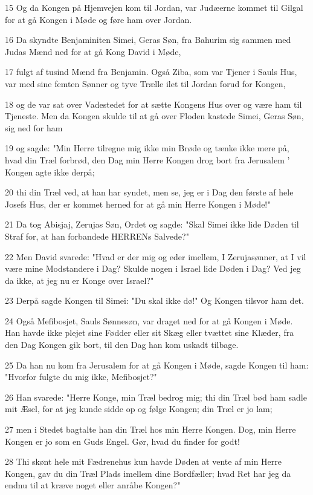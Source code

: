 \par 15 Og da Kongen på Hjemvejen kom til Jordan, var Judæerne kommet til Gilgal for at gå Kongen i Møde og føre ham over Jordan.
\par 16 Da skyndte Benjaminiten Simei, Geras Søn, fra Bahurim sig sammen med Judas Mænd ned for at gå Kong David i Møde,
\par 17 fulgt af tusind Mænd fra Benjamin. Også Ziba, som var Tjener i Sauls Hus, var med sine femten Sønner og tyve Trælle ilet til Jordan forud for Kongen,
\par 18 og de var sat over Vadestedet for at sætte Kongens Hus over og være ham til Tjeneste. Men da Kongen skulde til at gå over Floden kastede Simei, Geras Søn, sig ned for ham
\par 19 og sagde: "Min Herre tilregne mig ikke min Brøde og tænke ikke mere på, hvad din Træl forbrød, den Dag min Herre Kongen drog bort fra Jerusalem ' Kongen agte ikke derpå;
\par 20 thi din Træl ved, at han har syndet, men se, jeg er i Dag den første af hele Josefs Hus, der er kommet herned for at gå min Herre Kongen i Møde!"
\par 21 Da tog Abisjaj, Zerujas Søn, Ordet og sagde: "Skal Simei ikke lide Døden til Straf for, at han forbandede HERRENs Salvede?"
\par 22 Men David svarede: "Hvad er der mig og eder imellem, I Zerujasønner, at I vil være mine Modstandere i Dag? Skulde nogen i Israel lide Døden i Dag? Ved jeg da ikke, at jeg nu er Konge over Israel?"
\par 23 Derpå sagde Kongen til Simei: "Du skal ikke dø!" Og Kongen tilsvor ham det.
\par 24 Også Mefibosjet, Sauls Sønnesøn, var draget ned for at gå Kongen i Møde. Han havde ikke plejet sine Fødder eller sit Skæg eller tvættet sine Klæder, fra den Dag Kongen gik bort, til den Dag han kom uskadt tilbage.
\par 25 Da han nu kom fra Jerusalem for at gå Kongen i Møde, sagde Kongen til ham: "Hvorfor fulgte du mig ikke, Mefibosjet?"
\par 26 Han svarede: "Herre Konge, min Træl bedrog mig; thi din Træl bød ham sadle mit Æsel, for at jeg kunde sidde op og følge Kongen; din Træl er jo lam;
\par 27 men i Stedet bagtalte han din Træl hos min Herre Kongen. Dog, min Herre Kongen er jo som en Guds Engel. Gør, hvad du finder for godt!
\par 28 Thi skønt hele mit Fædrenehus kun havde Døden at vente af min Herre Kongen, gav du din Træl Plads imellem dine Bordfæller; hvad Ret har jeg da endnu til at kræve noget eller anråbe Kongen?"
